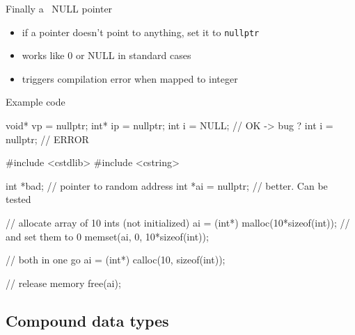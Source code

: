 \begin{frame}[fragile]
  \begin{block}{Finally a \cpp~NULL pointer}
    \begin{itemize}
    \item if a pointer doesn't point to anything, set it to \texttt{nullptr}
    \item works like 0 or NULL in standard cases
    \item triggers compilation error when mapped to integer
    \end{itemize}
  \end{block}
  \pause
  \begin{exampleblock}{Example code}
    \begin{cppcode*}{}
      void* vp = nullptr;
      int* ip = nullptr;
      int i = NULL;      // OK -> bug ?
      int i = nullptr;   // ERROR
    \end{cppcode*}
  \end{exampleblock}
\end{frame}

\begin{frame}[fragile]
  \begin{cppcode}
    #include <cstdlib>
    #include <cstring>

    int *bad;          // pointer to random address
    int *ai = nullptr; // better. Can be tested

    // allocate array of 10 ints (not initialized)
    ai = (int*) malloc(10*sizeof(int));
    // and set them to 0
    memset(ai, 0, 10*sizeof(int));

    // both in one go
    ai = (int*) calloc(10, sizeof(int));

    // release memory
    free(ai);
  \end{cppcode}
\end{frame}


\subsection[Compound]{Compound data types}

